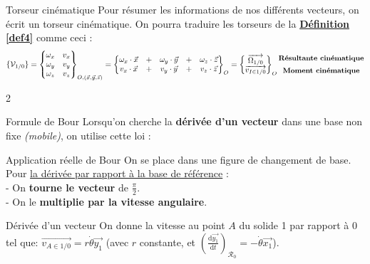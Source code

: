 \documentclass{article} %
\begin{document}
{\begin{definition}{Torseur cinématique}
Pour résumer les informations de nos différents vecteurs, on écrit un torseur cinématique.
On pourra traduire les torseurs de la \hyperref[def4]{\textcolor{mygreen}{\textbf{Définition \ref*{def4}}}} comme ceci :
$$\{\mathcal{V}_{1/0}\}=\begin{Bmatrix}
\omega_x & v_x \\
\omega_y & v_y \\
\omega_z & v_z \\
\end{Bmatrix}_{O,(\vec{x},\vec{y},\vec{z})}
= \begin{Bmatrix}
 \omega_x \cdot \vec{x} &+& \omega_y \cdot \vec{y} &+& \omega_z \cdot \vec{z} \\
 v_x \cdot \vec{x} &+& v_y \cdot \vec{y} &+& v_z \cdot \vec{z}  \\
\end{Bmatrix}_O = \begin{Bmatrix}
\overrightarrow{\Omega_{1/0}}\\
\overrightarrow{v_{I\in1/0}}\end{Bmatrix}_O \begin{matrix}
\textbf{{\small Résultante cinématique}}\vspace*{4pt} \\
\textbf{{\small Moment cinématique}}
\end{matrix}$$
\end{definition}
\begin{multicols}{2}
\noindent \begin{propriété}[label=formuledebour]{Formule de Bour}
Lorsqu'on cherche la \textbf{dérivée d'un vecteur} dans une base non fixe \textit{(mobile)}, on utilise cette loi :\vspace*{-5pt}
\end{propriété}\columnbreak
\begin{méthode}{Application réelle de Bour}
On se place dans une figure de changement de base.
Pour \underline{la dérivée par rapport à la base de référence} :\vspace{9pt}\\
- On \textbf{tourne le vecteur} de $\frac{\pi}{2}$.\\
- On le \textbf{multiplie par la vitesse angulaire}.
\end{méthode}
\end{multicols}
\begin{exemple}{Dérivée d'un vecteur}
On donne la vitesse au point $A$ du solide 1 par rapport à 0 tel que: $\overrightarrow{v_{A\in 1/0}}= r\dot{\theta}\vec{y_1}$ (avec $r$ constante, et $\left(\frac{\mathrm{d}\vec{y_1}}{\mathrm{d}t}\right)_{\mathcal{R}_0} = -\dot{\theta}\vec{x_1}$).


\end{exemple}}
\end{document}
